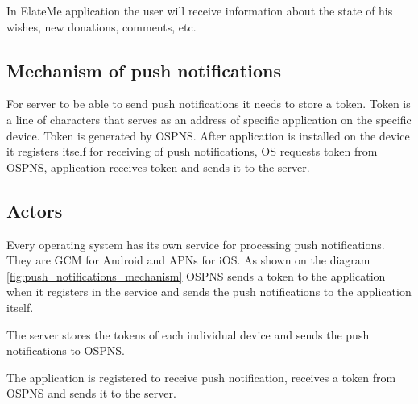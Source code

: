 In ElateMe application the user will receive information about the state of his wishes, new donations, comments, etc.

\subsection{Mechanism of push notifications}


For server to be able to send push notifications it needs to store a token. Token is a line of characters that serves
as an address of specific application on the specific device. Token is generated by \ac{OSPNS}. After application is
installed on the device it registers itself for receiving of push notifications, OS requests token from \ac{OSPNS},
application receives token and sends it to the server.

\subsection{Actors}

\begin{itemize}
Every operating system has its own service for processing push notifications. They are \ac{GCM} for Android and \ac{APNs}
for iOS. As shown on the diagram \ref{fig:push_notifications_mechanism} OSPNS sends a token to the application
when it registers in the service and sends the push notifications to the application itself.

The server stores the tokens of each individual device and sends the push notifications to OSPNS.

The application is registered to receive push notification, receives a token from OSPNS and sends it to the server.
\end{itemize}






